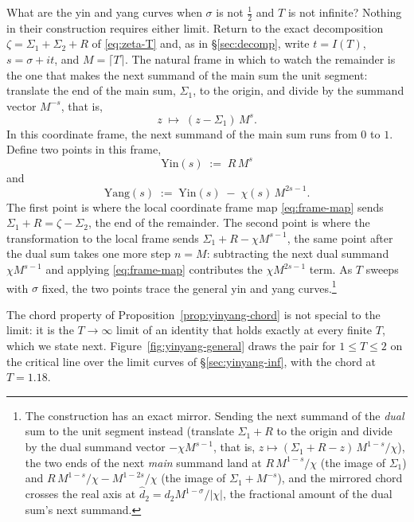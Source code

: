 \documentclass[11pt]{article}
\theoremstyle{definition}
\begin{document}
What are the yin and yang curves when $\sigma$ is not $\tfrac12$ and $T$
is not infinite? Nothing in their construction requires either limit.
Return to the exact
decomposition $\zeta=\Sigma_1+\Sigma_2+R$ of \eqref{eq:zeta-T} and, as
in \S\ref{sec:decomp}, write $t=I(T)$, $s=\sigma+it$, and
$M=\lceil T\rceil$. The natural frame in which to watch the remainder is
the one that makes the next summand of the main sum the unit segment:
translate the end of the main sum, $\Sigma_1$, to the origin, and divide
by the summand vector $M^{-s}$, that is,
\begin{equation}\label{eq:frame-map}
z\;\longmapsto\;(z-\Sigma_1)\,M^{s}.
\end{equation}
In this coordinate frame, the next summand of the main sum runs from $0$ to $1$.
Define two points in this frame,
\begin{equation}\label{eq:yin1}
\mathrm{Yin}(s)\;:=\;R\,M^{s}
\end{equation}
and
\begin{equation}\label{eq:yang1}
\mathrm{Yang}(s)\;:=\;\mathrm{Yin}(s)\;-\;\chi(s)\,M^{2s-1}.
\end{equation}
The first point is where the local coordinate frame map
\eqref{eq:frame-map} sends $\Sigma_1+R=\zeta-\Sigma_2$, the end of the
remainder. The second point is where the transformation to the local
frame sends $\Sigma_1+R-\chi M^{s-1}$, the
same point after the dual sum takes one more step $n=M$: subtracting the
next dual summand $\chi M^{s-1}$ and applying \eqref{eq:frame-map}
contributes the $\chi M^{2s-1}$ term. As $T$ sweeps with $\sigma$ fixed,
the two points trace the general yin and yang
curves.\footnote{The construction has an exact mirror. Sending the next
summand of the \emph{dual} sum to the unit segment instead (translate
$\Sigma_1+R$ to the origin and divide by the dual summand vector
$-\chi M^{s-1}$, that is, $z\mapsto(\Sigma_1+R-z)\,M^{1-s}/\chi$), the
two ends of the next \emph{main} summand land at $R\,M^{1-s}/\chi$ (the
image of $\Sigma_1$) and $R\,M^{1-s}/\chi-M^{1-2s}/\chi$ (the image of
$\Sigma_1+M^{-s}$), and the mirrored chord crosses the real axis at
$\hat d_2=d_2M^{1-\sigma}/|\chi|$, the fractional amount of the dual
sum's next summand.}

The chord property of Proposition~\ref{prop:yinyang-chord} is not
special to the limit: it is the $T\to\infty$ limit of an identity that
holds exactly at every finite $T$, which we state next. Figure~\ref{fig:yinyang-general} draws
the pair for $1\leq T\leq2$ on the critical line over the limit curves
of \S\ref{sec:yinyang-inf}, with the chord at $T=1.18$.
\end{document}
